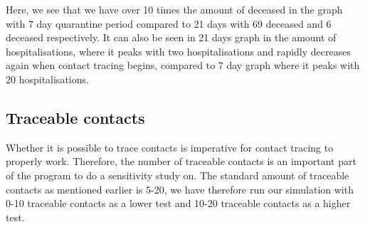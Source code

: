 Here, we see that we have over 10 times the amount of deceased in the graph with 7 day quarantine period compared to 21 days with 69 deceased and 6 deceased respectively. It can also be seen in 21 days graph in the amount of hospitalisations, where it peaks with two hospitalisations and rapidly decreases again when contact tracing begins, compared to 7 day graph where it peaks with 20 hospitalisations.


\subsection{Traceable contacts}

Whether it is possible to trace contacts is imperative for contact tracing to properly work. Therefore, the number of traceable contacts is an important part of the program to do a sensitivity study on. The standard amount of traceable contacts as mentioned earlier is 5-20, we have therefore run our simulation with 0-10 traceable contacts as a lower test and 10-20 traceable contacts as a higher test.

